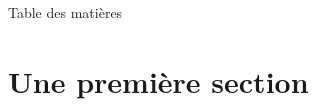 \documentclass[10pt]{beamer}
\begin{document}
\maketitle

\begin{frame}{Table des matières}
	\tableofcontents[hideallsubsections]
\end{frame}

\section{Une première section}
\end{document}
